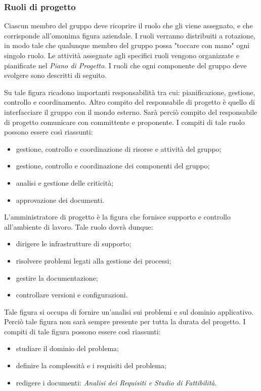 		\subsubsection{Ruoli di progetto}
		Ciascun membro del gruppo deve ricoprire il ruolo che gli viene assegnato, e che corrisponde all'omonima figura aziendale. I ruoli verranno distribuiti a rotazione, in modo tale che qualunque membro del gruppo possa "toccare con mano" ogni singolo ruolo. Le attività assegnate agli specifici ruoli vengono organizzate e pianificate nel \textit{Piano di Progetto}. I ruoli che ogni componente del gruppo deve svolgere sono descritti di seguito.
		
			Su tale figura ricadono importanti responsabilità tra cui: pianificazione, gestione, controllo e coordinamento. Altro compito del responsabile di progetto è quello di interfacciare il gruppo con il mondo esterno. Sarà perciò compito del responsabile di progetto comunicare con committente e proponente. I compiti di tale ruolo possono essere così riassunti:
			\begin{itemize}
				\item gestione, controllo e coordinazione di risorse e attività del gruppo;
				\item gestione, controllo e coordinazione dei componenti del gruppo;
				\item analisi e gestione delle criticità;
				\item approvazione dei documenti.
			\end{itemize}
		
			L'amministratore di progetto è la figura che fornisce supporto e controllo all'ambiente di lavoro. Tale ruolo dovrà dunque:
			\begin{itemize}
				\item dirigere le infrastrutture di supporto;
				\item risolvere problemi legati alla gestione dei processi;
				\item gestire la documentazione;
				\item controllare versioni e configurazioni.
			\end{itemize}
		
			Tale figura si occupa di fornire un'analisi sui problemi e sul dominio applicativo. Perciò tale figura non sarà sempre presente per tutta la durata del progetto.
			I compiti di tale figura possono essere così riassunti:
			\begin{itemize}
				\item studiare il dominio del problema;
				\item definire la complessità e i requisiti del problema;
				\item redigere i documenti: \textit{Analisi dei Requisiti e Studio di Fattibilità}.
			\end{itemize}
		
